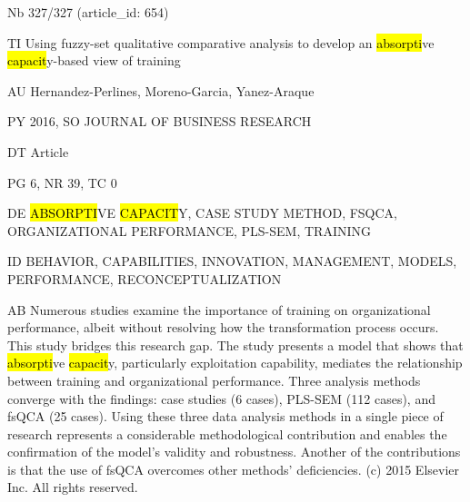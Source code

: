 \documentclass[a4paper]{article}
\begin{document}
\vspace*{-2cm}
Nb \tabto{0cm}327/327 (article\_id: 654)\par
TI \tabto{0cm}Using fuzzy-set qualitative comparative analysis to develop an \hl{absorpti}ve \hl{capacit}y-based view of training\par
AU \tabto{0cm}Hernandez-Perlines, Moreno-Garcia, Yanez-Araque\par
PY \tabto{0cm}2016, SO JOURNAL OF BUSINESS RESEARCH\par
DT \tabto{0cm}Article\par
PG \tabto{0cm}6, NR 39, TC 0\par
DE \tabto{0cm}\hl{ABSORPTI}VE \hl{CAPACIT}Y, CASE STUDY METHOD, FSQCA, ORGANIZATIONAL PERFORMANCE, PLS-SEM, TRAINING\par
ID \tabto{0cm}BEHAVIOR, CAPABILITIES, INNOVATION, MANAGEMENT, MODELS, PERFORMANCE, RECONCEPTUALIZATION\par
AB \tabto{0cm}Numerous studies examine the importance of training on organizational performance, albeit without resolving how the transformation process occurs. This study bridges this research gap. The study presents a model that shows that \hl{absorpti}ve \hl{capacit}y, particularly exploitation capability, mediates the relationship between training and organizational performance. Three analysis methods converge with the findings: case studies (6 cases), PLS-SEM (112 cases), and fsQCA (25 cases). Using these three data analysis methods in a single piece of research represents a considerable methodological contribution and enables the confirmation of the model's validity and robustness. Another of the contributions is that the use of fsQCA overcomes other methods' deficiencies. (c) 2015 Elsevier Inc. All rights reserved.\par
\clearpage
\end{document}
